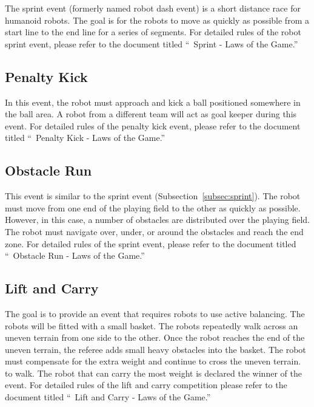 \documentclass[12pt]{hurocup}
\begin{document}
The sprint event (formerly named robot dash event) is a short distance
race for humanoid robots. The goal is for the robots to move as
quickly as possible from a start line to the end line for a series of
segments. For detailed rules of the robot sprint event, please refer to
the document titled ``\HuroCup\ Sprint - Laws of the Game.''

\subsection{Penalty Kick}
\label{subsec:penalty-kick}

In this event, the robot must approach and kick a ball positioned
somewhere in the ball area. A robot from a different team will act as
goal keeper during this event. For detailed rules of the penalty kick
event, please refer to the document titled ``\HuroCup\ Penalty
Kick - Laws of the Game.''

\subsection{Obstacle Run}
\label{subsec:obstacle-run} 

This event is similar to the sprint event
(Subsection~\ref{subsec:sprint}). The robot must move from one end of
the playing field to the other as quickly as possible. However, in
this case, a number of obstacles are distributed over the playing
field. The robot must navigate over, under, or around the obstacles
and reach the end zone. For detailed rules of the sprint event, please
refer to the document titled ``\HuroCup\ Obstacle Run - Laws of the
Game.''

\subsection{Lift and Carry}
\label{subsec:lift-and-carry}

The goal is to provide an event that requires robots to use active
balancing. The robots will be fitted with a small basket. The robots
repeatedly walk across an uneven terrain from one side to the
other. Once the robot reaches the end of the uneven terrain, the
referee adds small heavy obstacles into the basket. The robot must
compensate for the extra weight and continue to cross the uneven
terrain.  to walk. The robot that can carry the most weight is
declared the winner of the event. For detailed rules of the lift and
carry competition please refer to the document titled ``\HuroCup\ Lift
and Carry - Laws of the Game.''
\end{document}
